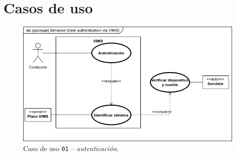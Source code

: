 \section{Casos de uso}

\begin{figure}[H]
  \centering
  \includegraphics[width=\linewidth]{diagrams/UseCases-UC1 - auth.png}
  \caption{Caso de uso \texttt{01} -- \textit{autenticación}.}
  \label{uc:auth}
\end{figure}

